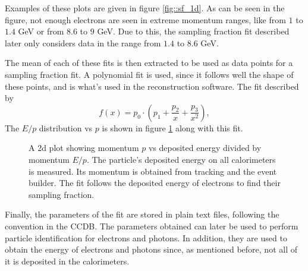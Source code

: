     Examples of these plots are given in figure \ref{fig::sf_1d}.
    As can be seen in the figure, not enough electrons are seen in extreme momentum ranges, like from $1$ to $1.4$ GeV or from $8.6$ to $9$ GeV.
    Due to this, the sampling fraction fit described later only considers data in the range from $1.4$ to $8.6$ GeV.

    The mean of each of these fits is then extracted to be used as data points for a sampling fraction fit.
    A polynomial fit is used, since it follows well the shape of these points, and is what's used in the reconstruction software.
    The fit described by
    \begin{equation*}
        f(x) = p_0 \cdot \left(p_1 + \frac{p_2}{x} + \frac{p_3}{x^2}\right),
    \end{equation*}
    The $E/p$ distribution vs $p$ is shown in figure \ref{fig::sf_2d} along with this fit.

    \begin{figure}[t!]
        \centering{}
        \caption[Calorimeters $p vs E/p$ plots]{A 2d plot showing momentum $p$ vs deposited energy divided by momentum $E/p$. The particle's deposited energy on all calorimeters is measured. Its momentum is obtained from tracking and the event builder. The fit follows the deposited energy of electrons to find their sampling fraction.}
        \label{fig::sf_2d}
    \end{figure}

    Finally, the parameters of the fit are stored in plain text files, following the convention in the CCDB.
    The parameters obtained can later be used to perform particle identification for electrons and photons.
    In addition, they are used to obtain the energy of electrons and photons since, as mentioned before, not all of it is deposited in the calorimeters.
